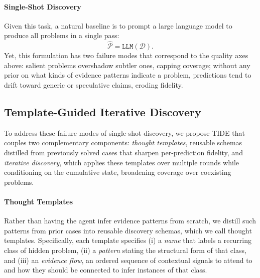 \paragraph{Single-Shot Discovery}
Given this task, a natural baseline is to prompt a large language model to produce all problems in a single pass:
\[
\hat{\mathcal{P}} = \texttt{LLM}(\mathcal{D}).
\]
Yet, this formulation has two failure modes that correspond to the quality axes above: salient problems overshadow subtler ones, capping coverage; without any prior on what kinds of evidence patterns indicate a problem, predictions tend to drift toward generic or speculative claims, eroding fidelity.

\subsection{Template-Guided Iterative Discovery}
\label{sec:method_main}

To address these failure modes of single-shot discovery, we propose \textsc{TIDE} that couples two complementary components: \textit{thought templates}, reusable schemas distilled from previously solved cases that sharpen per-prediction fidelity, and \textit{iterative discovery}, which applies these templates over multiple rounds while conditioning on the cumulative state, broadening coverage over coexisting problems.

\paragraph{Thought Templates}
Rather than having the agent infer evidence patterns from scratch, we distill such patterns from prior cases into reusable discovery schemas, which we call thought templates. Specifically, each template specifies (i) a \emph{name} that labels a recurring class of hidden problem, (ii) a \emph{pattern} stating the structural form of that class, and (iii) an \emph{evidence flow}, an ordered sequence of contextual signals to attend to and how they should be connected to infer instances of that class.

